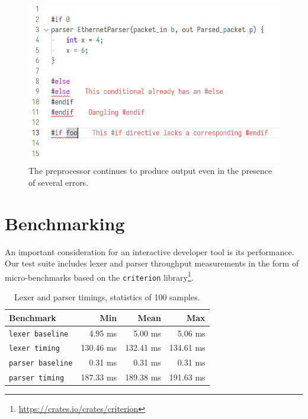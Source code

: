 \begin{figure}[t]
	\centering
	\includegraphics[width=\textwidth]{resources/p4analyzer-preprocessor-errors.png}
	\caption{The preprocessor continues to produce output even in the presence
	of several errors.}
	\label{fig:preprocessor-errors}
\end{figure}

\section{Benchmarking}

An important consideration for an interactive developer tool is its performance.
Our test suite includes lexer and parser throughput measurements in the form of
micro-benchmarks based on the \texttt{criterion}
library\footnote{\url{https://crates.io/crates/criterion}}.

\begin{table}[h]
	\centering
	\begin{tabular}{lrrr}
		\hline
		\textbf{Benchmark}         & Min       & \textbf{Mean} & Max \\
		\hline
		\texttt{lexer baseline}    & 4.95   ms & 5.00   ms & 5.06   ms \\
		\texttt{lexer timing}      & 130.46 ms & 132.41 ms & 134.61 ms \\
		\texttt{parser baseline}   & 0.31   ms & 0.31   ms & 0.31   ms \\
		\texttt{parser timing}     & 187.33 ms & 189.38 ms & 191.63 ms \\
		\hline
	\end{tabular}
	\caption{Lexer and parser timings, statistics of 100 samples.}
	\label{tab:throughput}
\end{table}

